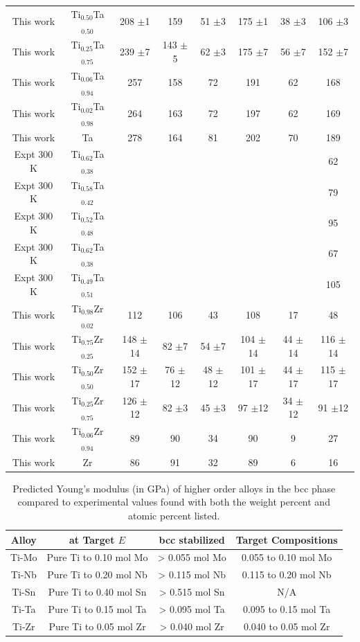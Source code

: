 \begin{longtable}[H]{ c c c c c c c c}
	This work & Ti$_{0.50}$Ta$_{0.50}$ & 208 $\pm$1 & 159 & 51 $\pm$3 & 175 $\pm$1 & 38 $\pm$3 & 106 $\pm$3\\
	This work & Ti$_{0.25}$Ta$_{0.75}$ & 239 $\pm$7 & 143 $\pm$5 & 62 $\pm$3 & 175 $\pm$7 & 56 $\pm$7 & 152 $\pm$7\\
	This work & Ti$_{0.06}$Ta$_{0.94}$ & 257 & 158 & 72 & 191 & 62 & 168\\
	This work & Ti$_{0.02}$Ta$_{0.98}$ & 264 & 163 & 72 & 197 & 62 & 169\\
	This work & Ta & 278 & 164 & 81 & 202 & 70 & 189\\
	Expt 300 K \cite{Fedotov1985} & Ti$_{0.62}$Ta$_{0.38}$ & & & & & & 62\\
	Expt 300 K \cite{Fedotov1985} & Ti$_{0.58}$Ta$_{0.42}$ & & & & & & 79\\
	Expt 300 K \cite{Fedotov1985} & Ti$_{0.52}$Ta$_{0.48}$ & & & & & & 95\\
	Expt 300 K \cite{Zhou2004a} & Ti$_{0.62}$Ta$_{0.38}$ & & & & & & 67\\
	Expt 300 K \cite{Zhou2004a} & Ti$_{0.49}$Ta$_{0.51}$ & & & & & & 105\\
	This work & Ti$_{0.98}$Zr$_{0.02}$ & 112 & 106 & 43 & 108 & 17 & 48\\
	This work & Ti$_{0.75}$Zr$_{0.25}$ & 148 $\pm$14 & 82 $\pm$7 & 54 $\pm$7 & 104 $\pm$14 & 44 $\pm$14 & 116 $\pm$14\\
	This work & Ti$_{0.50}$Zr$_{0.50}$ & 152 $\pm$17 & 76 $\pm$12 & 48 $\pm$12 & 101 $\pm$17 & 44 $\pm$17 & 115 $\pm$17\\
	This work & Ti$_{0.25}$Zr$_{0.75}$ & 126 $\pm$12 & 82 $\pm$3 & 45 $\pm$3 & 97 $\pm$12 & 34 $\pm$12 & 91 $\pm$12\\
	This work & Ti$_{0.06}$Zr$_{0.94}$ & 89 & 90 & 34 & 90 & 9 & 27\\
	This work & Zr & 86 & 91 & 32 & 89 & 6 & 16\\
	\hline
\end{longtable}

\newpage
\begin{table}[H]
	\caption{Predicted Young's modulus (in GPa) of higher order alloys in the bcc phase compared to experimental values found with both the weight percent and atomic percent listed.}
	\centering
	\begin{tabular}{ c c c c }
		\hline
		Alloy & at Target $E$ & bcc stabilized & Target Compositions\\
		\hline
		Ti-Mo & Pure Ti to 0.10 mol Mo & > 0.055 mol Mo & 0.055 to 0.10 mol Mo\\
		Ti-Nb & Pure Ti to 0.20 mol Nb & > 0.115 mol Nb & 0.115 to 0.20 mol Nb\\		
		Ti-Sn & Pure Ti to 0.40 mol Sn & > 0.515 mol Sn & N/A\\		
		Ti-Ta & Pure Ti to 0.15 mol Ta & > 0.095 mol Ta & 0.095 to 0.15 mol Ta\\
		Ti-Zr & Pure Ti to 0.05 mol Zr & > 0.040 mol Zr & 0.040 to 0.05 mol Zr\\		
		\hline
	\end{tabular}
	\label{Ch5-table:targetalloys}
\end{table}
\clearpage

